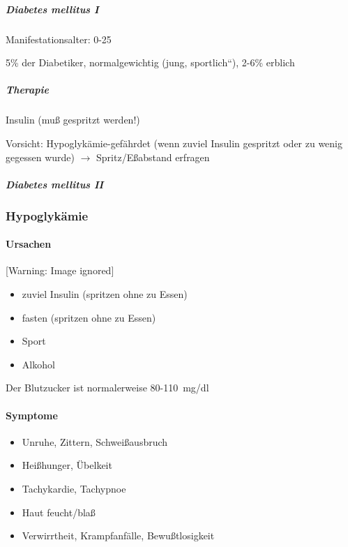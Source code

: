 \subparagraph[Diabetes \ mellitus I]{Diabetes  mellitus I}

Manifestationsalter: 0-25

5\% der Diabetiker, normalgewichtig ({\quotedblbase}jung,
sportlich{\textquotedblleft}), 2-6\% erblich

\subparagraph{Therapie}

{\mdseries
Insulin (mu{\ss} gespritzt werden!)}

{\mdseries
Vorsicht: Hypoglykämie-gefährdet (wenn zuviel Insulin gespritzt oder
zu wenig gegessen wurde) ${\rightarrow}$  Spritz/E{\ss}abstand
er\-fra\-gen}

\subparagraph[Diabetes \ mellitus II]{Diabetes  mellitus II}

\subsubsection{Hypoglykämie}

\paragraph{Ursachen}

\begin{center}
[Warning: Image ignored] %

\end{center}
\begin{itemize}
    \item {\mdseries
    zuviel Insulin (spritzen ohne zu Essen)}
    
    \item {\mdseries
    fasten (spritzen ohne zu Essen)}
    
    \item {\mdseries
    Sport}
    
    \item {\mdseries
    Alkohol}
    
\end{itemize}

Der Blutzucker ist normalerweise 80-110~mg/dl

\paragraph*{Symptome}

\begin{itemize}
    \item {\mdseries
    Unruhe, Zittern, Schwei{\ss}ausbruch}
    
    \item {\mdseries
    Hei{\ss}hunger, \"Ubelkeit}
    
    \item {\mdseries
    Tachykardie, Tachypnoe}
    
    \item {\mdseries
    Haut feucht/bla{\ss}}
    
    \item {\mdseries
    Verwirrtheit, Krampfanfälle, Bewu{\ss}tlosigkeit}
    
\end{itemize}

